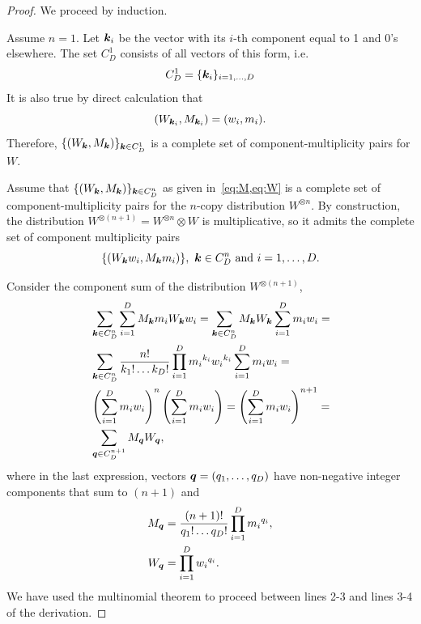 \begin{proof}
	We proceed by induction.
	
	Assume $n = 1$.
	Let $\bm{k}_i$ be the vector with its $i$-th component equal to 1 and 0's elsewhere.
	The set $C_D^1$ consists of all vectors of this form, i.e. 
\begin{equation*}
	C_D^1 = \{ \bm{k}_i \}_{i=1,\dots,D}
\end{equation*}
	It is also true by direct calculation that
\begin{equation*}
	\left( W_{\bm{k}_i}, M_{\bm{k}_i} \right) = (w_i, m_i).
\end{equation*}
Therefore, $\{ (W_{\bm{k}}, M_{\bm{k}}) \}_{\bm{k} \in C_D^1}$ is a complete set of component-multiplicity pairs for $W$.

	Assume that $\{(W_{\bm{k}}, M_{\bm{k}})\}_{\bm{k} \in C_D^n}$ as given in~\cref{eq:M,eq:W} is a complete set of component-multiplicity pairs for the $n$-copy distribution $W^{\otimes n}$.
	By construction, the distribution $W^{\otimes (n+1)} = W^{\otimes n} \otimes W$ is multiplicative, so it admits the complete set of component multiplicity pairs
\begin{equation}
	\{(W_{\bm{k}} w_i, M_{\bm{k}} m_i)\},\ \bm{k} \in C_D^n \text{ and } i=1,\dots,D.
\end{equation}
	
	Consider the component sum of the distribution $W^{\otimes (n+1)}$,
\begin{align*}
	&\sum_{\bm{k} \in C_D^n}\sum_{i=1}^D M_{\bm{k}} m_i W_{\bm{k}} w_i = \sum_{\bm{k} \in C_D^n} M_{\bm{k}}W_{\bm{k}} \sum_{i=1}^D m_i w_i =\\
	&\sum_{\bm{k} \in C_D^n} \frac{n!}{k_1!\dots k_D!} \prod\limits_{i=1}^D {m_i}^{k_i}{w_i}^{k_i} \sum_{i=1}^D m_i w_i =\\
	&\left( \sum_{i=1}^D m_i w_i \right)^n \left( \sum_{i=1}^D m_i w_i \right) = \left( \sum_{i=1}^D m_i w_i \right)^{n+1} =\\
	&\sum_{\bm{q} \in C_D^{n+1}} M_{\bm{q}}W_{\bm{q}},
\end{align*}
where in the last expression, vectors $\bm{q} = (q_1, \dots, q_D)$ have non-negative integer components that sum to $(n+1)$ and 
\begin{align*}
	M_{\bm{q}} &= \frac{(n+1)!}{q_1!\dots q_D!} \prod\limits_{i=1}^D {m_i}^{q_i},\\
	W_{\bm{q}} &= \prod\limits_{i=1}^D {w_i}^{q_i}.
\end{align*}
We have used the multinomial theorem to proceed between lines 2-3 and lines 3-4 of the derivation.


\end{proof}
